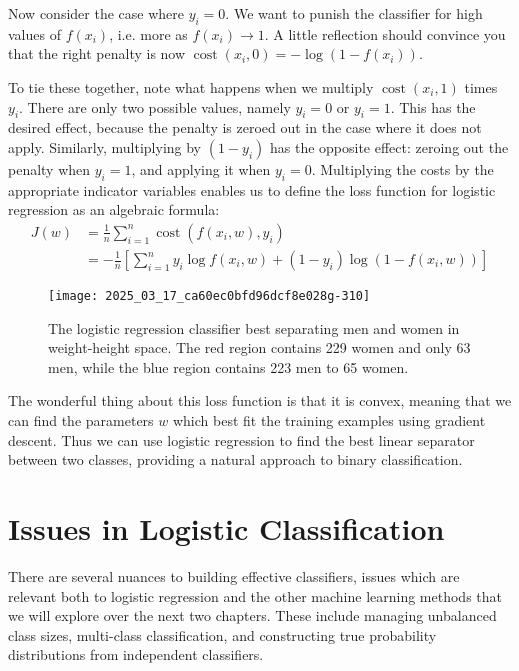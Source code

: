 \documentclass[10pt]{article}
\begin{document}
Now consider the case where \(y_{i}=0\). We want to punish the classifier for high values of \(f(x_{i})\), i.e. more as \(f(x_{i}) \rightarrow 1\). A little reflection should convince you that the right penalty is now \(\operatorname{cost}(x_{i}, 0)=-\log (1-f(x_{i}))\).

To tie these together, note what happens when we multiply \(\operatorname{cost}(x_{i}, 1)\) times \(y_{i}\). There are only two possible values, namely \(y_{i}=0\) or \(y_{i}=1\). This has the desired effect, because the penalty is zeroed out in the case where it does not apply. Similarly, multiplying by \((1-y_{i})\) has the opposite effect: zeroing out the penalty when \(y_{i}=1\), and applying it when \(y_{i}=0\). Multiplying the costs by the appropriate indicator variables enables us to define the loss function for logistic regression as an algebraic formula:
\[
\begin{aligned}
J(w) & =\frac{1}{n} \sum_{i=1}^{n} \operatorname{cost}\left(f\left(x_{i}, w\right), y_{i}\right) \\
& =-\frac{1}{n}\left[\sum_{i=1}^{n} y_{i} \log f(x_{i}, w)+\left(1-y_{i}\right) \log \left(1-f(x_{i}, w)\right)\right]
\end{aligned}
\]
\begin{figure}[h]
    \centering
    \texttt{[image: 2025\_03\_17\_ca60ec0bfd96dcf8e028g-310]}
    \caption{The logistic regression classifier best separating men and women in weight-height space. The red region contains 229 women and only 63 men, while the blue region contains 223 men to 65 women.}
\end{figure}

The wonderful thing about this loss function is that it is convex, meaning that we can find the parameters \(w\) which best fit the training examples using gradient descent. Thus we can use logistic regression to find the best linear separator between two classes, providing a natural approach to binary classification.

\section{Issues in Logistic Classification}
There are several nuances to building effective classifiers, issues which are relevant both to logistic regression and the other machine learning methods that we will explore over the next two chapters. These include managing unbalanced class sizes, multi-class classification, and constructing true probability distributions from independent classifiers.
\end{document}
